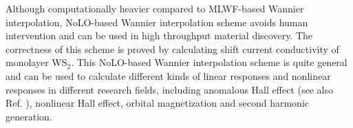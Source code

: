 Although computationally heavier compared to MLWF-based Wannier interpolation, NoLO-based Wannier interpolation scheme avoids human intervention and can be used in high throughput material discovery. The correctness of this scheme is proved by calculating shift current conductivity of monolayer WS$_2$. This NoLO-based Wannier interpolation scheme is quite general and can be used to calculate different kinds of linear responses and nonlinear responses in different research fields\cite{tokura_nonreciprocal_2018}, including anomalous Hall effect (see also Ref. ), nonlinear Hall effect, orbital magnetization and second harmonic generation.

